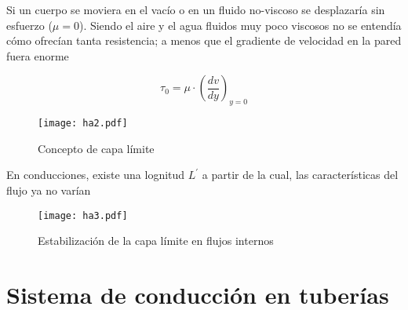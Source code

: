 \begin{definition}
    Si un cuerpo se moviera en el vacío o en un fluido no-viscoso se desplazaría sin esfuerzo ($\mu=0$). Siendo el aire y el agua fluidos muy poco viscosos no se entendía cómo ofrecían tanta resistencia; a menos que el gradiente de velocidad en la pared fuera enorme
\end{definition}

\begin{equation}
    \tau_0 =\mu\cdot\left(\frac{dv}{dy}\right)_{y = 0}
\end{equation}

\begin{figure}[h!]
\centering
  \texttt{[image: ha2.pdf]}
  \caption{Concepto de capa límite}
  \label{ha2}
\end{figure}

En conducciones, existe una lognitud $L^{\prime}$ a partir de la cual, las características del flujo ya no varían

\begin{figure}[h!]
\centering
  \texttt{[image: ha3.pdf]}
  \caption{Estabilización de la capa límite en flujos internos}
  \label{ha3}
\end{figure}
\section{Sistema de conducción en tuberías}

